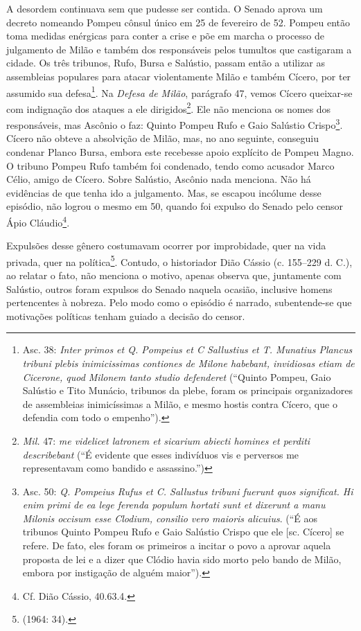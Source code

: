 A desordem continuava sem que pudesse ser contida. O Senado aprova um decreto
nomeando Pompeu cônsul único em 25 de fevereiro de 52.  Pompeu então toma
medidas enérgicas para conter a crise e põe em marcha o processo de julgamento
de Milão e também dos responsáveis pelos tumultos que castigaram a cidade. Os
três tribunos, Rufo, Bursa e Salústio, passam então a utilizar as assembleias
populares para atacar violentamente Milão e também Cícero, por ter assumido sua
defesa\footnote{Asc. 38: \emph{Inter primos et Q. Pompeius et C Sallustius et
T. Munatius Plancus tribuni plebis inimicissimas contiones de Milone habebant,
invidiosas etiam de Cicerone, quod Milonem tanto studio defenderet} (``Quinto
Pompeu, Gaio Salústio e Tito Munácio, tribunos da plebe, foram os principais
organizadores de assembleias inimicíssimas a  Milão, e mesmo hostis contra
Cícero, que o defendia com todo o empenho'').}. Na \emph{Defesa de Milão},
parágrafo 47, vemos Cícero queixar-se com indignação dos ataques a ele
dirigidos\footnote{\emph{Mil.} 47: \emph{me videlicet latronem et
sicarium abiecti homines et perditi describebant} (``É evidente que esses
indivíduos vis e perversos me representavam como bandido e assassino.'')}. Ele
não menciona os nomes dos responsáveis, mas Ascônio o faz: Quinto Pompeu Rufo e
Gaio Salústio Crispo\footnote{Asc. 50: \emph{Q. Pompeius Rufus et C. Sallustus
tribuni fuerunt quos significat. Hi enim primi de ea lege ferenda populum
hortati sunt et dixerunt a manu Milonis occisum esse Clodium, consilio vero
maioris alicuius}. (``É aos tribunos Quinto Pompeu Rufo e
Gaio Salústio Crispo que ele [sc. Cícero] se refere. De fato, eles foram os primeiros a incitar  o povo a aprovar aquela proposta de lei e a dizer que Clódio havia sido morto pelo
bando de Milão, embora por instigação de alguém maior”).}.  Cícero não obteve a
absolvição de Milão, mas, no ano seguinte, conseguiu condenar Planco Bursa,
embora este recebesse apoio explícito de Pompeu Magno. O tribuno Pompeu Rufo
também foi condenado, tendo como acusador Marco Célio, amigo de Cícero. Sobre
Salústio, Ascônio nada menciona. Não há evidências de que tenha ido a
julgamento. Mas, se escapou incólume desse episódio, não logrou o mesmo em 50,
quando foi expulso do Senado pelo censor Ápio Cláudio\footnote{ Cf. Dião
Cássio, 40.63.4.}. 

Expulsões desse gênero costumavam ocorrer por improbidade, quer na vida
privada, quer na política\footnote{ (1964: 34).}. Contudo, o historiador
Dião Cássio (c. 155--229 d. C.), ao relatar o fato, não menciona o motivo,
apenas observa que, juntamente com Salústio, outros foram expulsos do Senado
naquela ocasião, inclusive homens pertencentes à nobreza. Pelo modo como o
episódio é narrado, subentende-se que motivações políticas tenham guiado a
decisão do censor.

